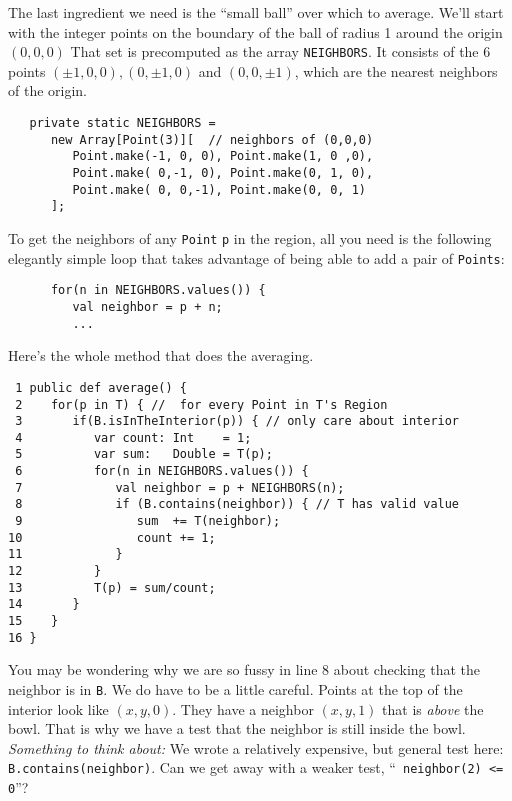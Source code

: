 The last ingredient we need is the ``small ball'' over which to average. We'll
start with the integer points on the boundary of the ball of radius 1 around the
origin $(0,0,0)$  That set is precomputed as the array {\tt NEIGHBORS}. 
It consists of the 6
points $(\pm 1, 0, 0), (0, \pm 1, 0)$  and $(0, 0, \pm 1)$, which are the
nearest neighbors of the origin.
\begin{verbatim}
   private static NEIGHBORS = 
      new Array[Point(3)][  // neighbors of (0,0,0)
         Point.make(-1, 0, 0), Point.make(1, 0 ,0),
         Point.make( 0,-1, 0), Point.make(0, 1, 0),
         Point.make( 0, 0,-1), Point.make(0, 0, 1)
      ];
\end{verbatim}
To get the neighbors of any {\tt Point} {\tt p} in the region, all you need is the
following elegantly simple loop that takes advantage of being able to add a pair
of {\tt Points}:
\begin{verbatim}
      for(n in NEIGHBORS.values()) {
         val neighbor = p + n;
         ...
\end{verbatim}
Here's the whole method that does the averaging.  
\begin{verbatim}
 1 public def average() {
 2    for(p in T) { //  for every Point in T's Region
 3       if(B.isInTheInterior(p)) { // only care about interior
 4          var count: Int    = 1;
 5          var sum:   Double = T(p);
 6          for(n in NEIGHBORS.values()) {
 7             val neighbor = p + NEIGHBORS(n);
 8             if (B.contains(neighbor)) { // T has valid value
 9                sum  += T(neighbor);
10                count += 1;
11             }
12          }
13          T(p) = sum/count; 
14       }
15    }
16 }
\end{verbatim}
You may be wondering why we are so fussy in line 8 about checking
that the neighbor is in {\tt B}.  We do
have to be a little careful.  Points at the top of
the interior look like $(x,y,0)$.
They have a neighbor $(x,y,1)$ that is {\em above} the bowl. 
That is why we have a test that the neighbor is still inside the
bowl.  {\em Something to think about:}
We wrote a relatively expensive, but general test here:
{\tt B.contains(neighbor)}. Can we get away with a weaker test, ``{\tt
neighbor(2) <= 0}''?

